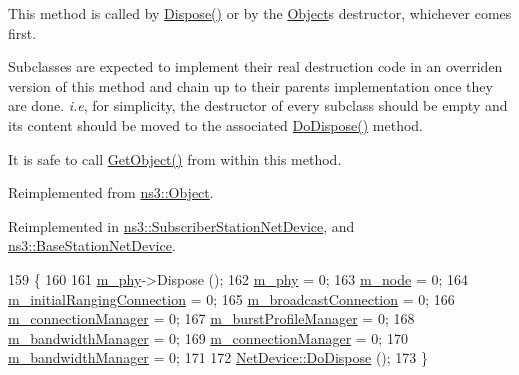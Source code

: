 This method is called by \hyperlink{classns3_1_1Object_aa90ae598863f6c251cdab3c3722afdaf}{Dispose()} or by the \hyperlink{classns3_1_1Object}{Object}\textquotesingle{}s destructor, whichever comes first.

Subclasses are expected to implement their real destruction code in an overriden version of this method and chain up to their parent\textquotesingle{}s implementation once they are done. {\itshape i.\+e}, for simplicity, the destructor of every subclass should be empty and its content should be moved to the associated \hyperlink{classns3_1_1WimaxNetDevice_a63b484b4e6d842fc80662876070bdbfc}{Do\+Dispose()} method.

It is safe to call \hyperlink{classns3_1_1Object_a13e18c00017096c8381eb651d5bd0783}{Get\+Object()} from within this method. 

Reimplemented from \hyperlink{classns3_1_1Object_a475d429a75d302d4775f4ae32479b287}{ns3\+::\+Object}.



Reimplemented in \hyperlink{classns3_1_1SubscriberStationNetDevice_ab96e90bdc3192e51179510a4a1f59c51}{ns3\+::\+Subscriber\+Station\+Net\+Device}, and \hyperlink{classns3_1_1BaseStationNetDevice_a0e29042356915d5485abbdd386e82af9}{ns3\+::\+Base\+Station\+Net\+Device}.


\begin{DoxyCode}
159 \{
160 
161   \hyperlink{classns3_1_1WimaxNetDevice_a729df9652f39cacba57b0f527bc43f10}{m\_phy}->Dispose ();
162   \hyperlink{classns3_1_1WimaxNetDevice_a729df9652f39cacba57b0f527bc43f10}{m\_phy} = 0;
163   \hyperlink{classns3_1_1WimaxNetDevice_ae164e0049ff0faa009a967b9e4757d92}{m\_node} = 0;
164   \hyperlink{classns3_1_1WimaxNetDevice_a2bcfecf3dcc39a5953561c544358e84d}{m\_initialRangingConnection} = 0;
165   \hyperlink{classns3_1_1WimaxNetDevice_a601399b26a925d59e4161cf73bb354b0}{m\_broadcastConnection} = 0;
166   \hyperlink{classns3_1_1WimaxNetDevice_a7b49b2dfb4fcf9f10879d306ee5d8d69}{m\_connectionManager} = 0;
167   \hyperlink{classns3_1_1WimaxNetDevice_a11d983c009fb78f70e01b67a06400e8f}{m\_burstProfileManager} = 0;
168   \hyperlink{classns3_1_1WimaxNetDevice_a109ed0791e501c8380b9d683d0412ac1}{m\_bandwidthManager} = 0;
169   \hyperlink{classns3_1_1WimaxNetDevice_a7b49b2dfb4fcf9f10879d306ee5d8d69}{m\_connectionManager} = 0;
170   \hyperlink{classns3_1_1WimaxNetDevice_a109ed0791e501c8380b9d683d0412ac1}{m\_bandwidthManager} = 0;
171 
172   \hyperlink{classns3_1_1Object_a475d429a75d302d4775f4ae32479b287}{NetDevice::DoDispose} ();
173 \}
\end{DoxyCode}


